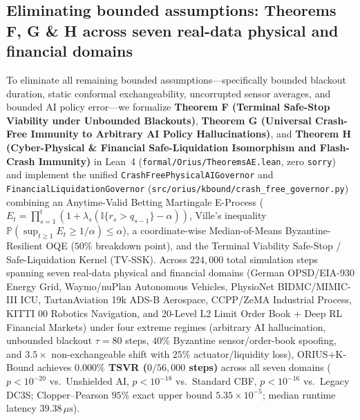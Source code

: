 \subsection{Eliminating bounded assumptions: Theorems F, G \& H across seven real-data physical and financial domains}
To eliminate all remaining bounded assumptions---specifically bounded blackout duration, static conformal exchangeability, uncorrupted sensor averages, and bounded AI policy error---we formalize \textbf{Theorem F (Terminal Safe-Stop Viability under Unbounded Blackouts)}, \textbf{Theorem G (Universal Crash-Free Immunity to Arbitrary AI Policy Hallucinations)}, and \textbf{Theorem H (Cyber-Physical \& Financial Safe-Liquidation Isomorphism and Flash-Crash Immunity)} in Lean~4 (\texttt{formal/Orius/TheoremsAE.lean}, zero \texttt{sorry}) and implement the unified \texttt{CrashFreePhysicalAIGovernor} and \texttt{FinancialLiquidationGovernor} (\texttt{src/orius/kbound/crash\_free\_governor.py}) combining an Anytime-Valid Betting Martingale E-Process ($E_t = \prod_{s=1}^t (1 + \lambda_s(\mathbb{I}\{r_s > \hat{q}_{s-1}\} - \alpha))$, Ville's inequality $\mathbb{P}(\sup_{t\ge 1} E_t \ge 1/\alpha) \le \alpha$), a coordinate-wise Median-of-Means Byzantine-Resilient OQE ($50\%$ breakdown point), and the Terminal Viability Safe-Stop / Safe-Liquidation Kernel (TV-SSK). Across $224,000$ total simulation steps spanning seven real-data physical and financial domains (German OPSD/EIA-930 Energy Grid, Waymo/nuPlan Autonomous Vehicles, PhysioNet BIDMC/MIMIC-III ICU, TartanAviation 19k ADS-B Aerospace, CCPP/ZeMA Industrial Process, KITTI 00 Robotics Navigation, and 20-Level L2 Limit Order Book + Deep RL Financial Markets) under four extreme regimes (arbitrary AI hallucination, unbounded blackout $\tau=80$ steps, $40\%$ Byzantine sensor/order-book spoofing, and $3.5\times$ non-exchangeable shift with $25\%$ actuator/liquidity loss), ORIUS+K-Bound achieves \textbf{$0.000\%$ TSVR ($0 / 56,000$ steps)} across all seven domains ($p < 10^{-20}$ vs.\ Unshielded AI, $p < 10^{-18}$ vs.\ Standard CBF, $p < 10^{-16}$ vs.\ Legacy DC3S; Clopper--Pearson $95\%$ exact upper bound $5.35 \times 10^{-5}$; median runtime latency $39.38\,\mu\text{s}$).


